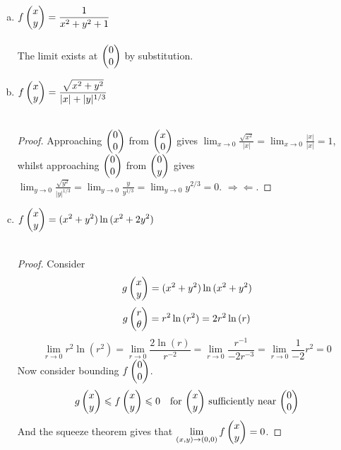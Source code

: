 \begin{enumerate}[a.]
  \item $\displaystyle f\begin{pmatrix} x \\ y \end{pmatrix} = \frac{1}{x^2+y^2+1}$ \\
   \\
  The limit exists at $\begin{pmatrix} 0 \\ 0 \end{pmatrix}$ by substitution.

  \item $\displaystyle f\begin{pmatrix} x \\ y \end{pmatrix} = \frac{\sqrt{x^2+y^2}}{|x|+|y|^{1/3}}$ \\
    \\
  \begin{proof}
    Approaching $\begin{pmatrix} 0 \\ 0 \end{pmatrix}$ from $\begin{pmatrix} x \\ 0 \end{pmatrix}$ gives $\displaystyle \lim_{x\rightarrow 0} \frac{\sqrt{x^2}}{|x|} = \lim_{x\rightarrow 0}\frac{|x|}{|x|} = 1$, whilst approaching $\begin{pmatrix} 0 \\ 0 \end{pmatrix}$ from $\begin{pmatrix} 0 \\ y \end{pmatrix}$ gives $\displaystyle \lim_{y\rightarrow 0} \frac{\sqrt{y^2}}{|y|^{1/3}}=\lim_{y\rightarrow 0}\frac{y}{y^{1/3}}=\lim_{y\rightarrow 0}y^{2/3}=0$. $\Rightarrow\!\Leftarrow$.
  \end{proof}

  \item $\displaystyle f\begin{pmatrix} x \\ y \end{pmatrix} = (x^2 + y^2) \ln{(x^2+2y^2)}$ \\
  \\
  \begin{proof}
    Consider
  \[g\begin{pmatrix} x \\ y \end{pmatrix} = (x^2 + y^2) \ln{(x^2+y^2)}\]
  \[g\begin{pmatrix} r \\ \theta \end{pmatrix} = r^2 \ln{(r^2)}=2r^2 \ln{(r)}\]
  \[\lim_{r\rightarrow 0} r^2 \ln{(r^2)} = \lim_{r\rightarrow 0} \frac{2\ln{(r)}}{r^{-2}} = \lim_{r\rightarrow 0} \frac{r^{-1}}{-2r^{-3}} = \lim_{r\rightarrow 0} \frac{1}{-2} r^2=0\]
  Now consider bounding $f\begin{pmatrix} 0 \\ 0 \end{pmatrix}$.
  \[g\begin{pmatrix} x \\ y \end{pmatrix} \leqslant f\begin{pmatrix} x \\ y \end{pmatrix} \leqslant 0 \quad \text{for $\begin{pmatrix} x \\ y \end{pmatrix}$ sufficiently near $\begin{pmatrix} 0 \\ 0 \end{pmatrix}$}\]
  And the squeeze theorem gives that $\displaystyle \lim_{(x,y)\rightarrow (0,0)}f\begin{pmatrix} x \\ y \end{pmatrix} = 0$. \end{proof}


\end{enumerate}
